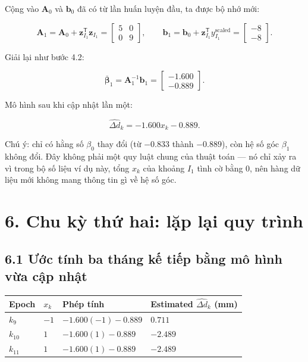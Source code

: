\documentclass[12pt]{article}
\begin{document}
Cộng vào $\boldsymbol{A}_0$ và $\boldsymbol{b}_0$ đã có từ lần huấn luyện đầu, ta được bộ nhớ mới:

\[
\boldsymbol{A}_1
=
\boldsymbol{A}_0
+
\boldsymbol{z}_{I_1}^{\mathsf{T}}\boldsymbol{z}_{I_1}
=
\begin{bmatrix}
5 & 0\\
0 & 9
\end{bmatrix},
\qquad
\boldsymbol{b}_1
=
\boldsymbol{b}_0
+
\boldsymbol{z}_{I_1}^{\mathsf{T}}y_{I_1}^{\mathrm{scaled}}
=
\begin{bmatrix}
-8\\
-8
\end{bmatrix}.
\]

Giải lại như bước 4.2:

\[
\overline{\boldsymbol{\beta}}_1
=
\boldsymbol{A}_1^{-1}\boldsymbol{b}_1
=
\begin{bmatrix}
-1.600\\
-0.889
\end{bmatrix}.
\]

Mô hình sau khi cập nhật lần một:

\[
\widehat{\Delta d}_k
=
-1.600x_k-0.889.
\]

Chú ý: chỉ có hằng số $\beta_0$ thay đổi (từ $-0.833$ thành $-0.889$), còn hệ số góc $\beta_1$ không đổi. Đây không phải một quy luật chung của thuật toán — nó chỉ xảy ra vì trong bộ số liệu ví dụ này, tổng $x_k$ của khoảng $I_1$ tình cờ bằng 0, nên hàng dữ liệu mới không mang thông tin gì về hệ số góc.

\section{6. Chu kỳ thứ hai: lặp lại quy trình}

\subsection{6.1 Ước tính ba tháng kế tiếp bằng mô hình vừa cập nhật}

\begin{longtable}{@{}llll@{}}
\toprule
Epoch & $x_k$ & Phép tính & Estimated $\widehat{\Delta d}_k$ (mm) \\
\midrule
$k_9$ & $-1$ & $-1.600(-1)-0.889$ & $0.711$ \\
$k_{10}$ & $1$ & $-1.600(1)-0.889$ & $-2.489$ \\
$k_{11}$ & $1$ & $-1.600(1)-0.889$ & $-2.489$ \\
\bottomrule
\end{longtable}
\end{document}
